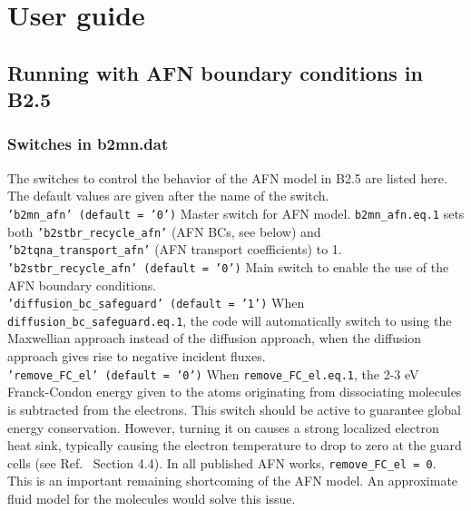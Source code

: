 \chapter{User guide}

\section{Running with AFN boundary conditions in B2.5}

 \subsection{Switches in b2mn.dat}

The switches to control the behavior of the AFN model in B2.5 are listed here. The default values are given after the name of the switch. \newline
\\
{\tt 'b2mn\_afn' (default = '0')} \newline
Master switch for AFN model. {\tt b2mn\_afn.eq.1} sets both {\tt 'b2stbr\_recycle\_afn'} (AFN BCs, see below) and {\tt 'b2tqna\_transport\_afn'} (AFN transport coefficients) to 1. \newline
\\
{\tt 'b2stbr\_recycle\_afn' (default = '0')} \newline
Main switch to enable the use of the AFN boundary conditions. \newline
\\
{\tt 'diffusion\_bc\_safeguard' (default = '1')} \newline
When {\tt diffusion\_bc\_safeguard.eq.1}, the code will automatically switch to using the Maxwellian approach instead of the diffusion approach, when the diffusion approach gives rise to negative incident fluxes. \newline
\\
{\tt 'remove\_FC\_el' (default = '0')} \newline
When {\tt remove\_FC\_el.eq.1}, the 2-3 eV Franck-Condon energy given to the atoms originating from dissociating molecules is subtracted from the electrons. This switch should be active to guarantee global energy conservation. However, turning it on causes a strong localized electron heat sink, typically causing the electron temperature to drop to zero at the guard cells (see Ref.~\cite{phd_wim} Section 4.4). In all published AFN works, {\tt remove\_FC\_el = 0}. This is an important remaining shortcoming of the AFN model. An approximate fluid model for the molecules would solve this issue. \newline
